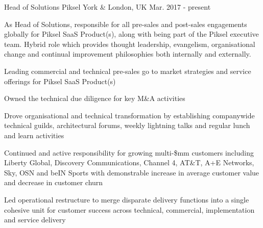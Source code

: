 \begin{cventries}

\cvexpentry
{Head of Solutions} %
{Piksel} %
{York \& London, UK} %
{Mar. 2017 - present} %
{
\begin{cvitemstitle}
\item {As Head of Solutions, responsible for all pre-sales and post-sales engagements globally for Piksel SaaS Product(s), along with being part of the Piksel executive team. Hybrid role which provides thought leadership, evangelism, organisational change and continual improvement philosophies both internally and externally.}
\end{cvitemstitle}
}
{ %
\begin{cvitems}
\item {Leading commercial and technical pre-sales go to market strategies and service offerings for Piksel SaaS Product(s)}
\item {Owned the technical due diligence for key M\&A activities}
\item {Drove organisational and technical transformation by establishing companywide technical guilds, architectural forums, weekly lightning talks and regular lunch and learn activities}
\item {Continued and active responsibility for growing multi-\$mm customers including Liberty Global, Discovery Communications, Channel 4, AT\&T, A+E Networks, Sky, OSN and beIN Sports with demonstrable increase in average customer value and decrease in customer churn}
\item {Led operational restructure to merge disparate delivery functions into a single cohesive unit for customer success across technical, commercial, implementation and service delivery}
\end{cvitems}
}



\end{cventries}
